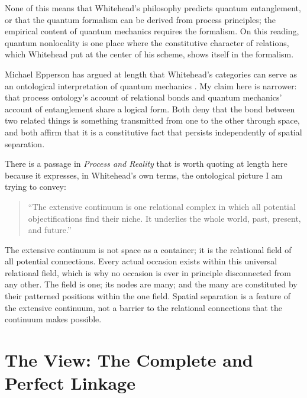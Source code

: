None of this means that Whitehead's philosophy predicts quantum entanglement, or that the quantum formalism can be derived from process principles; the empirical content of quantum mechanics requires the formalism. On this reading, quantum nonlocality is one place where the constitutive character of relations, which Whitehead put at the center of his scheme, shows itself in the formalism.

Michael Epperson has argued at length that Whitehead's categories can serve as an ontological interpretation of quantum mechanics \citep{Epperson2004}. My claim here is narrower: that process ontology's account of relational bonds and quantum mechanics' account of entanglement share a logical form. Both deny that the bond between two related things is something transmitted from one to the other through space, and both affirm that it is a constitutive fact that persists independently of spatial separation.

There is a passage in \textit{Process and Reality} that is worth quoting at length here because it expresses, in Whitehead's own terms, the ontological picture I am trying to convey:

\begin{quote}
``The extensive continuum is one relational complex in which all potential objectifications find their niche. It underlies the whole world, past, present, and future.''
\citep[pp.~79--80]{Whitehead1929} %
\end{quote}

The extensive continuum is not space as a container; it is the relational field of all potential connections. Every actual occasion exists within this universal relational field, which is why no occasion is ever in principle disconnected from any other. The field is one; its nodes are many; and the many are constituted by their patterned positions within the one field. Spatial separation is a feature of the extensive continuum, not a barrier to the relational connections that the continuum makes possible.

\section{The \bahai View: The Complete and Perfect Linkage}
\label{sec:ch8-bahai}


